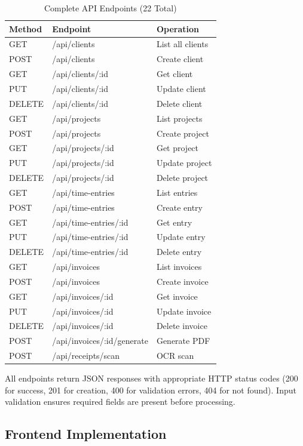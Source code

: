 \documentclass[conference]{IEEEtran}
\begin{document}
\begin{table}[H]
\centering
\caption{Complete API Endpoints (22 Total)}
\begin{tabular}{lll}
\toprule
\textbf{Method} & \textbf{Endpoint} & \textbf{Operation} \\
\midrule
GET & /api/clients & List all clients \\
POST & /api/clients & Create client \\
GET & /api/clients/:id & Get client \\
PUT & /api/clients/:id & Update client \\
DELETE & /api/clients/:id & Delete client \\
GET & /api/projects & List projects \\
POST & /api/projects & Create project \\
GET & /api/projects/:id & Get project \\
PUT & /api/projects/:id & Update project \\
DELETE & /api/projects/:id & Delete project \\
GET & /api/time-entries & List entries \\
POST & /api/time-entries & Create entry \\
GET & /api/time-entries/:id & Get entry \\
PUT & /api/time-entries/:id & Update entry \\
DELETE & /api/time-entries/:id & Delete entry \\
GET & /api/invoices & List invoices \\
POST & /api/invoices & Create invoice \\
GET & /api/invoices/:id & Get invoice \\
PUT & /api/invoices/:id & Update invoice \\
DELETE & /api/invoices/:id & Delete invoice \\
POST & /api/invoices/:id/generate & Generate PDF \\
POST & /api/receipts/scan & OCR scan \\
\bottomrule
\end{tabular}
\end{table}

All endpoints return JSON responses with appropriate HTTP status codes (200 for success, 201 for creation, 400 for validation errors, 404 for not found). Input validation ensures required fields are present before processing.

\subsection{Frontend Implementation}
\end{document}
